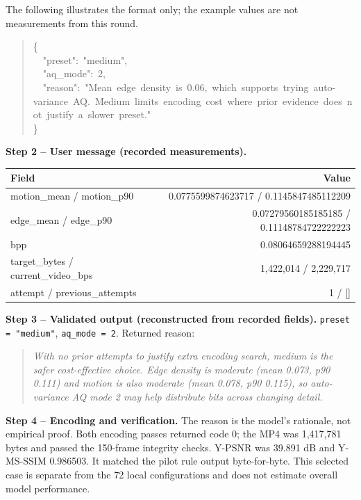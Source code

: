 \documentclass[conference]{IEEEtran}
\begin{document}
\begin{tcolorbox}
The following illustrates the format only; the example values are not measurements from this round.\par
\begin{minipage}{\linewidth}
\begin{quote}\small\ttfamily\raggedright
\{\\
\ \ "preset":\ "medium",\\
\ \ "aq\_mode":\ 2,\\
\allowbreak\ \allowbreak\ "reason":\allowbreak\ "Mean\allowbreak\ edge\allowbreak\ density\allowbreak\ is\allowbreak\ 0.06,\allowbreak\ which\allowbreak\ supports\allowbreak\ trying\allowbreak\ auto-variance\allowbreak\ AQ.\allowbreak\ Medium\allowbreak\ limits\allowbreak\ encoding\allowbreak\ cost\allowbreak\ where\allowbreak\ prior\allowbreak\ evidence\allowbreak\ does\allowbreak\ not\allowbreak\ justify\allowbreak\ a\allowbreak\ slower\allowbreak\ preset."\\
\}\\
\end{quote}
\end{minipage}
\end{tcolorbox}
\textbf{Step 2 -- User message (recorded measurements).}
\begin{center}\small\begin{tabular}{lr}\toprule
Field & Value\\\midrule
motion\_mean / motion\_p90 & 0.0775599874623717 / 0.1145847485112209\\
edge\_mean / edge\_p90 & 0.07279560185185185 / 0.11148784722222223\\
bpp & 0.08064659288194445\\
target\_bytes / current\_video\_bps & 1,422,014 / 2,229,717\\
attempt / previous\_attempts & 1 / []\\\bottomrule\end{tabular}\end{center}
\textbf{Step 3 -- Validated output (reconstructed from recorded fields).} \texttt{preset = "medium"}, \texttt{aq\_mode = 2}. Returned reason:
\begin{quote}\small\itshape
With no prior attempts to justify extra encoding search, medium is the safer cost-effective choice. Edge density is moderate (mean 0.073, p90 0.111) and motion is also moderate (mean 0.078, p90 0.115), so auto-variance AQ mode 2 may help distribute bits across changing detail.
\end{quote}
\textbf{Step 4 -- Encoding and verification.} The reason is the model's rationale, not empirical proof. Both encoding passes returned code 0; the MP4 was 1,417,781 bytes and passed the 150-frame integrity checks. Y-PSNR was 39.891 dB and Y-MS-SSIM 0.986503. It matched the pilot rule output byte-for-byte. This selected case is separate from the 72 local configurations and does not estimate overall model performance.
\end{document}
